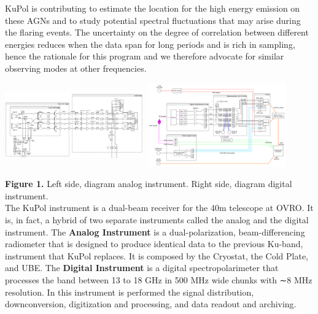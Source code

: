 \documentclass[a0paper,portrait]{baposter}
\begin{document}
\begin{poster}
{{}
}
{\small{KuPol is contributing to estimate the location for the high energy emission on these AGNs and to study potential spectral fluctuations that may arise during the flaring events. The uncertainty on the degree of correlation between different energies reduces when the data span for long periods and is rich in sampling, hence the rationale for this program and we therefore advocate for similar observing modes at other frequencies.}
\begin{center}
\includegraphics [height=36mm, width=60mm] {analogo.jpeg}
\hspace{0.2cm}
\includegraphics [height=36mm, width=60mm] {KuPol_Digital.pdf}
\end{center}
\textbf{Figure 1.} Left side, diagram analog instrument. Right side, diagram digital instrument.\\
\small{The KuPol instrument is a dual-beam receiver for the 40m telescope at OVRO. It is, in fact, a hybrid of two separate instruments called the analog and the digital instrument. The \textbf{Analog Instrument} is a dual-polarization, beam-differencing radiometer that is designed to produce identical data to the previous Ku-band, instrument that KuPol replaces. It is composed by the Cryostat, the Cold Plate, and UBE. The \textbf{Digital Instrument} is a digital spectropolarimeter that processes the band between 13 to 18 GHz in 500 MHz wide chunks with ∼8 MHz resolution. In this instrument is performed the signal distribution, downconversion, digitization and processing, and data readout and archiving.}

}
\end{poster}
\end{document}
